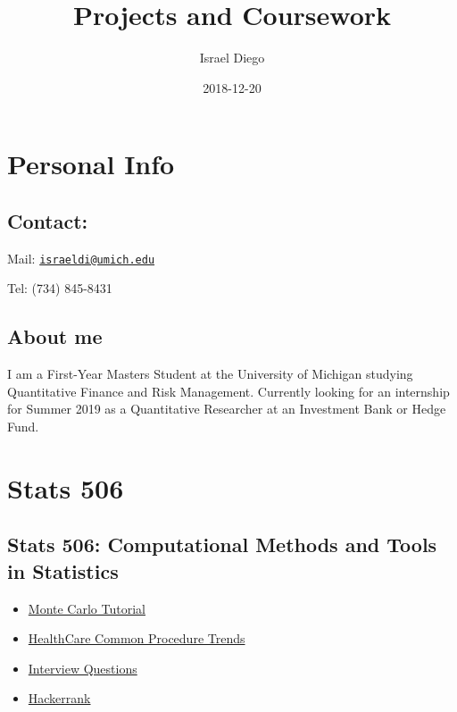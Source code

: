 \documentclass[]{book}
\title{Projects and Coursework}
\author{Israel Diego}
\date{2018-12-20}
\providecommand{\tightlist}{%
  \setlength{\itemsep}{0pt}\setlength{\parskip}{0pt}}
\begin{document}
\maketitle

{
\setcounter{tocdepth}{1}
\tableofcontents
}
\hypertarget{personal-info}{%
\chapter{Personal Info}\label{personal-info}}

\hypertarget{contact}{%
\section{Contact:}\label{contact}}

Mail: \href{mailto:israeldi@umich.edu}{\nolinkurl{israeldi@umich.edu}}

Tel: (734) 845-8431

\hypertarget{about-me}{%
\section{About me}\label{about-me}}

I am a First-Year Masters Student at the University of Michigan studying
Quantitative Finance and Risk Management. Currently looking for an internship
for Summer 2019 as a Quantitative Researcher at an Investment Bank or Hedge Fund.

\hypertarget{stats-506}{%
\chapter{Stats 506}\label{stats-506}}

\hypertarget{stats-506-computational-methods-and-tools-in-statistics}{%
\section{Stats 506: Computational Methods and Tools in Statistics}\label{stats-506-computational-methods-and-tools-in-statistics}}

\begin{itemize}
\tightlist
\item
  \href{https://israeldi.github.io/Stats506/finalProject.html}{Monte Carlo Tutorial}\\
\item
  \href{https://israeldi.github.io/Stats506/individual_project.html}{HealthCare Common Procedure Trends}\\
\item
  \href{./Python/python-secret-notebook.ipynb}{Interview Questions}\\
\item
  \href{https://github.com/israeldi/umich-python/blob/master/python-hackerrank-notebook.ipynb}{Hackerrank}
\end{itemize}
\end{document}
